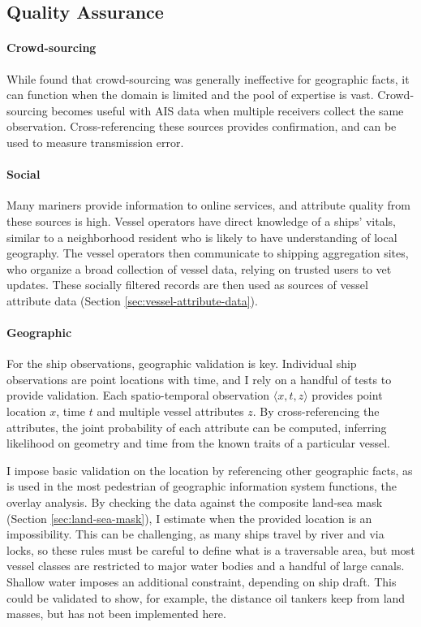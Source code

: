 \subsection{Quality Assurance}
\paragraph{Crowd-sourcing}
While \cite{goodchildli2012} found that crowd-sourcing was generally ineffective for geographic facts, it can function when the domain is limited and the pool of expertise is vast. Crowd-sourcing becomes useful with AIS data when multiple receivers collect the same observation. Cross-referencing these sources provides confirmation, and can be used to measure transmission error.

\paragraph{Social}
Many mariners provide information to online services, and attribute quality from these sources is high. Vessel operators have direct knowledge of a ships' vitals, similar to a neighborhood resident who is likely to have understanding of local geography. The vessel operators then communicate to shipping aggregation sites, who organize a broad collection of vessel data, relying on trusted users to vet updates. These socially filtered records are then used as sources of vessel attribute data (Section \ref{sec:vessel-attribute-data}).

\paragraph{Geographic}
For the ship observations, geographic validation is key. Individual ship observations are point locations with time, and I rely on a handful of tests to provide validation. Each spatio-temporal observation $\langle x, t, z \rangle$ provides point location $x$, time $t$ and multiple vessel attributes $z$.  %
 By cross-referencing the attributes, the joint probability of each attribute can be computed, inferring likelihood on geometry and time from the known traits of a particular vessel.

I impose basic validation on the location by referencing other geographic facts, as is used in the most pedestrian of geographic information system functions, the overlay analysis. By checking the data against the composite land-sea mask (Section \ref{sec:land-sea-mask}), I estimate when the provided location is an impossibility. This can be challenging, as many ships travel by river and via locks, so these rules must be careful to define what is a traversable area, but most vessel classes are restricted to major water bodies and a handful of large canals. Shallow water imposes an additional constraint, depending on ship draft. This could be validated to show, for example, the distance oil tankers keep from land masses, but has not been implemented here.

